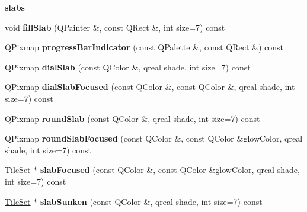 \begin{Indent}\textbf{ slabs}\par
\begin{DoxyCompactItemize}
\item 
\mbox{\label{class_style_helper_a531c5ce74e719b08111c2159b38a0035}} 
void {\bfseries fill\+Slab} (Q\+Painter \&, const Q\+Rect \&, int size=7) const
\item 
\mbox{\label{class_style_helper_a628ceeaef61036653d735cc2d716e90f}} 
Q\+Pixmap {\bfseries progress\+Bar\+Indicator} (const Q\+Palette \&, const Q\+Rect \&) const
\item 
\mbox{\label{class_style_helper_a6f64547230e9d275c62849e13f78a94a}} 
Q\+Pixmap {\bfseries dial\+Slab} (const Q\+Color \&, qreal shade, int size=7) const
\item 
\mbox{\label{class_style_helper_a45c2193b9fd8b2fea19cca2213ce071e}} 
Q\+Pixmap {\bfseries dial\+Slab\+Focused} (const Q\+Color \&, const Q\+Color \&, qreal shade, int size=7) const
\item 
\mbox{\label{class_style_helper_a04d8b27cc4b069bfeb4ebd9c340b3e68}} 
Q\+Pixmap {\bfseries round\+Slab} (const Q\+Color \&, qreal shade, int size=7) const
\item 
\mbox{\label{class_style_helper_a23633124bd94d416b66bae683790c969}} 
Q\+Pixmap {\bfseries round\+Slab\+Focused} (const Q\+Color \&, const Q\+Color \&glow\+Color, qreal shade, int size=7) const
\item 
\mbox{\label{class_style_helper_a826ffe1c6709ced420e0598f0fdeeaea}} 
\hyperlink{class_tile_set}{Tile\+Set} $\ast$ {\bfseries slab\+Focused} (const Q\+Color \&, const Q\+Color \&glow\+Color, qreal shade, int size=7) const
\item 
\mbox{\label{class_style_helper_a236a1f276bd70e5876736f08ee498a9f}} 
\hyperlink{class_tile_set}{Tile\+Set} $\ast$ {\bfseries slab\+Sunken} (const Q\+Color \&, qreal shade, int size=7) const
\item 
\mbox{\label{class_style_helper_a5bb869153a37ec7e4350e15c165fcfd6}} 

\end{DoxyCompactItemize}
\end{Indent}
